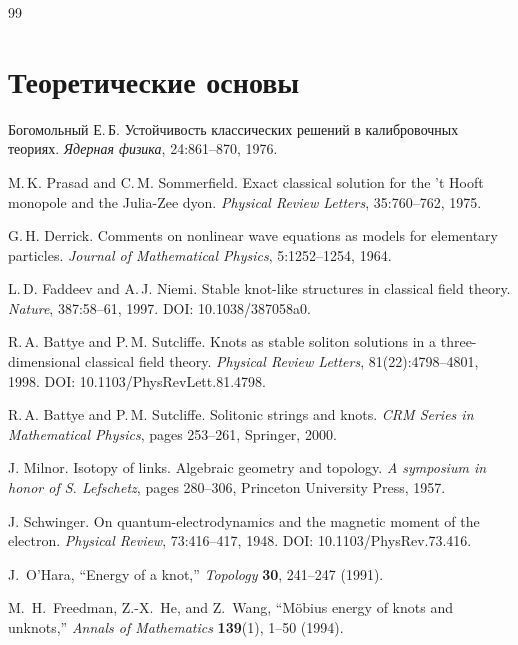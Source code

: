 \documentclass[11pt,a4paper]{article}
\begin{document}
	\begin{thebibliography}{99}
		
		\section*{Теоретические основы}
		
		Богомольный Е.\,Б.
		\newblock Устойчивость классических решений в калибровочных теориях.
		\newblock \textit{Ядерная физика}, 24:861--870, 1976.
		
		M.\,K. Prasad and C.\,M. Sommerfield.
		\newblock Exact classical solution for the 't Hooft monopole and the Julia-Zee dyon.
		\newblock \textit{Physical Review Letters}, 35:760--762, 1975.
		
		G.\,H. Derrick.
		\newblock Comments on nonlinear wave equations as models for elementary particles.
		\newblock \textit{Journal of Mathematical Physics}, 5:1252--1254, 1964.
		
		L.\,D. Faddeev and A.\,J. Niemi.
		\newblock Stable knot-like structures in classical field theory.
		\newblock \textit{Nature}, 387:58--61, 1997.
		\newblock DOI: 10.1038/387058a0.
		
		R.\,A. Battye and P.\,M. Sutcliffe.
		\newblock Knots as stable soliton solutions in a three-dimensional classical field theory.
		\newblock \textit{Physical Review Letters}, 81(22):4798--4801, 1998.
		\newblock DOI: 10.1103/PhysRevLett.81.4798.
		
		R.\,A. Battye and P.\,M. Sutcliffe.
		\newblock Solitonic strings and knots.
		\newblock \textit{CRM Series in Mathematical Physics}, pages 253--261, Springer, 2000.
		
		J. Milnor.
		\newblock Isotopy of links. Algebraic geometry and topology.
		\newblock \textit{A symposium in honor of S. Lefschetz}, pages 280--306, Princeton University Press, 1957.
		
		J. Schwinger.
		\newblock On quantum-electrodynamics and the magnetic moment of the electron.
		\newblock \textit{Physical Review}, 73:416--417, 1948.
		\newblock DOI: 10.1103/PhysRev.73.416.
		
		 J.~O'Hara, ``Energy of a knot,''
		\textit{Topology}
		\textbf{30}, 241--247 (1991).
		
		 M.~H.~Freedman, Z.-X.~He, and Z.~Wang, ``Möbius energy of knots and unknots,''
		\textit{Annals of Mathematics}
		\textbf{139}(1), 1--50 (1994).
		

\end{thebibliography}
\end{document}
